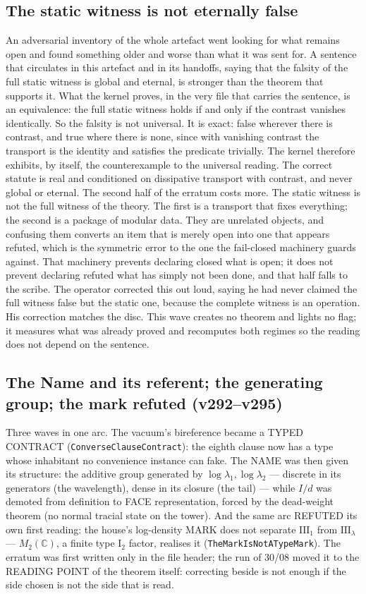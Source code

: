 \documentclass[11pt]{article}
\theoremstyle{definition}\newtheorem{deriv}{Derivation}
\begin{document}
\subsection*{The static witness is not eternally false}An adversarial inventory of the whole artefact went looking for what remains open and found something older and worse than what it was sent for. A sentence that circulates in this artefact and in its handoffs, saying that the falsity of the full static witness is global and eternal, is stronger than the theorem that supports it. What the kernel proves, in the very file that carries the sentence, is an equivalence: the full static witness holds if and only if the contrast vanishes identically. So the falsity is not universal. It is exact: false wherever there is contrast, and true where there is none, since with vanishing contrast the transport is the identity and satisfies the predicate trivially. The kernel therefore exhibits, by itself, the counterexample to the universal reading. The correct statute is real and conditioned on dissipative transport with contrast, and never global or eternal. The second half of the erratum costs more. The static witness is not the full witness of the theory. The first is a transport that fixes everything; the second is a package of modular data. They are unrelated objects, and confusing them converts an item that is merely open into one that appears refuted, which is the symmetric error to the one the fail-closed machinery guards against. That machinery prevents declaring closed what is open; it does not prevent declaring refuted what has simply not been done, and that half falls to the scribe. The operator corrected this out loud, saying he had never claimed the full witness false but the static one, because the complete witness is an operation. His correction matches the disc. This wave creates no theorem and lights no flag; it measures what was already proved and recomputes both regimes so the reading does not depend on the sentence.

\subsection*{The Name and its referent; the generating group; the mark refuted (v292--v295)}Three waves in one arc. The vacuum's bireference became a TYPED CONTRACT (\texttt{ConverseClauseContract}): the eighth clause now has a type whose inhabitant no convenience instance can fake. The NAME was then given its structure: the additive group generated by $\log\lambda_1,\log\lambda_2$ --- discrete in its generators (the wavelength), dense in its closure (the tail) --- while $I/d$ was demoted from definition to FACE representation, forced by the dead-weight theorem (no normal tracial state on the tower). And the same arc REFUTED its own first reading: the house's log-density MARK does not separate $\mathrm{III}_1$ from $\mathrm{III}_\lambda$ --- $M_2(\mathbb{C})$, a finite type $\mathrm{I}_2$ factor, realises it (\texttt{TheMarkIsNotATypeMark}). The erratum was first written only in the file header; the run of 30/08 moved it to the READING POINT of the theorem itself: correcting beside is not enough if the side chosen is not the side that is read.
\end{document}
